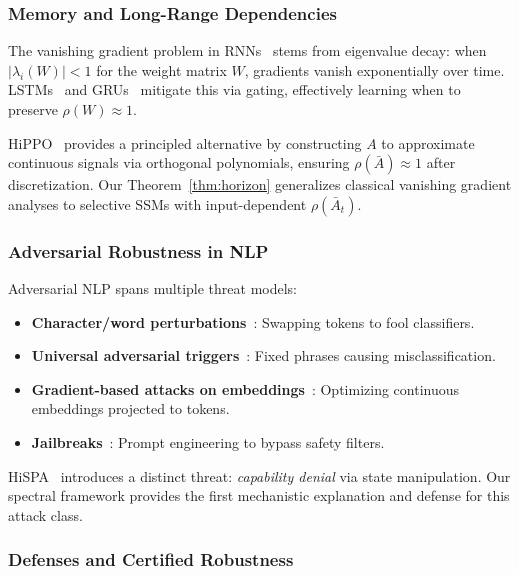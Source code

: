 \documentclass[10pt,twocolumn]{article}
\begin{document}
\subsubsection{Memory and Long-Range Dependencies}

The vanishing gradient problem in RNNs~\cite{bengio1994learning,hochreiter1997lstm} stems from eigenvalue decay: when $|\lambda_i(W)| < 1$ for the weight matrix $W$, gradients vanish exponentially over time. LSTMs~\cite{hochreiter1997lstm} and GRUs~\cite{cho2014learning} mitigate this via gating, effectively learning when to preserve $\rho(W) \approx 1$.

HiPPO~\cite{gu2020hippo} provides a principled alternative by constructing $A$ to approximate continuous signals via orthogonal polynomials, ensuring $\rho(\bar{A}) \approx 1$ after discretization. Our Theorem~\ref{thm:horizon} generalizes classical vanishing gradient analyses to selective SSMs with input-dependent $\rho(\bar{A}_t)$.

\subsubsection{Adversarial Robustness in NLP}

Adversarial NLP spans multiple threat models:
\begin{itemize}
\item \textbf{Character/word perturbations}~\cite{ebrahimi2018hotflip,gao2018black}: Swapping tokens to fool classifiers.
\item \textbf{Universal adversarial triggers}~\cite{wallace2019universal}: Fixed phrases causing misclassification.
\item \textbf{Gradient-based attacks on embeddings}~\cite{zou2023universal}: Optimizing continuous embeddings projected to tokens.
\item \textbf{Jailbreaks}~\cite{liu2023jailbreak,wei2023jailbroken}: Prompt engineering to bypass safety filters.
\end{itemize}

HiSPA~\cite{lemercier2026hispa} introduces a distinct threat: \emph{capability denial} via state manipulation. Our spectral framework provides the first mechanistic explanation and defense for this attack class.

\subsubsection{Defenses and Certified Robustness}
\end{document}
